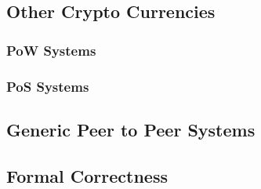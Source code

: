 \documentclass{report}
\theoremstyle{definition}{
  \newtheorem{lemma}{Lemma}[section] %
  \newtheorem{definition}[lemma]{Definition}
}
\theoremstyle{theorem}{
  \newtheorem{invariant}[lemma]{Invariant}
  \newtheorem{proofobligation}[lemma]{Proof Obligation}
}
\numberwithin{equation}{lemma}
\begin{document}
\subsection{Other Crypto Currencies}
\subsubsection{PoW Systems}
\subsubsection{PoS Systems}
\subsection{Generic Peer to Peer Systems}
\subsection{Formal Correctness}
\end{document}

